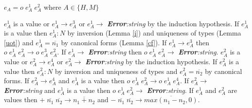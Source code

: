 \begin{case}
$e_{A}=o\;e_{A}^{1}\;e_{A}^{2}$ where $A\in\lbrace H,M\rbrace$

$e_{A}^{1}$ is a value or $e_{A}^{1}\rightarrow e_{A}^{3}$ or $e_{A}^{1}\rightarrow$ \emph{\textbf{Error}:\;string} by the induction hypothesis.  If $e_{A}^{1}$ is a value then $e_{A}^{1}:N$ by inversion (Lemma \ref{i}) and uniqueness of types (Lemma \ref{uot}) and $e_{A}^{1}=\overline{n_{1}}$ by canonical forms (Lemma \ref{cf}).  If $e_{A}^{1}\rightarrow e_{A}^{3}$ then $o\;e_{A}^{1}\;e_{A}^{2}\rightarrow o\;e_{A}^{3}\;e_{A}^{2}$.  If $e_{A}^{1}\rightarrow$ \emph{\textbf{Error}:\;string} then $o\;e_{A}^{1}\;e_{A}^{2}\rightarrow$ \emph{\textbf{Error}:\;string}.  $e_{A}^{2}$ is a value or $e_{A}^{2}\rightarrow e_{A}^{4}$ or $e_{A}^{2}\rightarrow$ \emph{\textbf{Error}:\;string} by the induction hypothesis.  If $e_{A}^{2}$ is a value then $e_{A}^{2}:N$ by inversion and uniqueness of types and $e_{A}^{2}=\overline{n_{2}}$ by canonical forms.  If $e_{A}^{2}\rightarrow e_{A}^{4}$ and $e_{A}^{1}$ is a value then $o\;e_{A}^{1}\;e_{A}^{2}\rightarrow o\;e_{A}^{1}\;e_{A}^{4}$.  If $e_{A}^{2}\rightarrow$ \emph{\textbf{Error}:\;string} and $e_{A}^{1}$ is a value then $o\;e_{A}^{1}\;e_{A}^{2}\rightarrow$ \emph{\textbf{Error}:\;string}.  If $e_{A}^{1}$ and $e_{A}^{2}$ are values then $+\;\overline{n_{1}}\;\overline{n_{2}}\rightarrow\overline{n_{1}+n_{2}}$ and $-\;\overline{n_{1}}\;\overline{n_{2}}\rightarrow\overline{max(n_{1}-n_{2},0)}$.
\end{case}